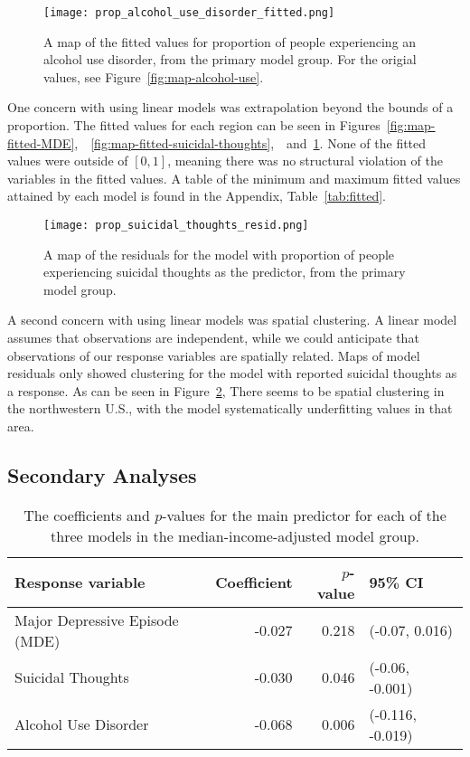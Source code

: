 \documentclass{article}
\begin{document}
\begin{figure}[!htb]
    \centering
    \texttt{[image: prop\_alcohol\_use\_disorder\_fitted.png]}
    \caption{\label{fig:map-fitted-alcohol-use}A map of the fitted values for proportion of people experiencing an
    alcohol use disorder, from the primary model group.
    For the origial values, see Figure~\ref{fig:map-alcohol-use}.}
\end{figure}

One concern with using linear models was extrapolation
beyond the bounds of a proportion.
The fitted values for each region can be seen in
Figures~\ref{fig:map-fitted-MDE},\
~\ref{fig:map-fitted-suicidal-thoughts},\
~and~\ref{fig:map-fitted-alcohol-use}.
None of the fitted values were outside of $[0,1]$,
meaning there was no structural violation of the
variables in the fitted values.
A table of the minimum and maximum fitted values
attained by each model is found in the Appendix,
Table~\ref{tab:fitted}.

\begin{figure}[!htb]
    \centering
    \texttt{[image: prop\_suicidal\_thoughts\_resid.png]}
    \caption{\label{fig:map-resid-suicidal-thoughts}A map of the residuals
    for the model with
    proportion of people experiencing
    suicidal thoughts as the predictor,
    from the primary model group.
    }
\end{figure}

A second concern with using linear models was spatial clustering.
A linear model assumes that observations are independent,
while we could anticipate that observations of our response variables
are spatially related.
Maps of model residuals only showed clustering for
the model with reported suicidal thoughts as a response.
As can be seen in Figure~\ref{fig:map-resid-suicidal-thoughts},
There seems to be spatial clustering
in the northwestern U.S.,
with the model systematically underfitting values
in that area.

\subsection{Secondary Analyses}

\begin{table}[t]
\begin{center}
\begin{tabular}{l r r l}
    \toprule
    Response variable & Coefficient & $p$-value & 95\% CI\\
    \midrule
    Major Depressive Episode (MDE) & -0.027 & 0.218 & (-0.07, 0.016)\\
    Suicidal Thoughts & -0.030 & 0.046 & (-0.06, -0.001)\\
    Alcohol Use Disorder & -0.068 & 0.006 & (-0.116, -0.019)\\
    \bottomrule
\end{tabular}
\caption{\label{tab:median-income-model-results} The coefficients and $p$-values
    for the main predictor for each of the three models
    in the median-income-adjusted model group.
}
\end{center}
\end{table}
\end{document}
